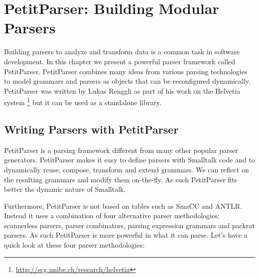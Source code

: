 \documentclass[a4paper,10pt,twoside]{book}
\begin{document}
\fi
\sloppy
\chapter{PetitParser: Building Modular Parsers}

\chapterauthor{\authorjankurs{} \\ \authorguillaume{} \\ \authorlukas{}}

\newcommand{\ppmthind}[1]{\clsmthind{PPParser}{#1}}

Building parsers to analyze and transform data is a common task in
software development. In this chapter we present a powerful parser
framework called PetitParser. PetitParser combines many ideas from
various parsing technologies to model grammars and parsers as objects
that can be reconfigured dynamically. PetitParser was written by Lukas
Renggli as part of his work on the Helvetia system \footnote{\url{http://scg.unibe.ch/research/helvetia}} but it can be used
as a standalone library.

\section{Writing Parsers with PetitParser}

PetitParser is a parsing framework different from many other popular
parser generators. PetitParser makes it easy to define parsers with
Smalltalk code and to dynamically reuse, compose, transform and extend
grammars. We can reflect on the resulting grammars and modify them
on-the-fly. As such PetitParser fits better the dynamic nature of
Smalltalk.

Furthermore, PetitParser is not based on tables such as SmaCC and
ANTLR. Instead it uses a combination of four alternative parser
methodologies: scannerless parsers, parser combinators, parsing
expression grammars and packrat parsers. As such PetitParser is more
powerful in what it can parse. Let's have a quick look at these four
parser methodologies:
\end{document}
